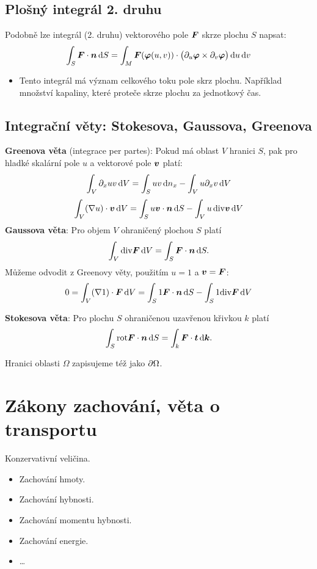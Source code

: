\subsection{Plošný integrál 2. druhu}
Podobně lze integrál (2. druhu) vektorového pole $\mathbf{\boldsymbol{F}}$ skrze plochu $S$ napsat:
\[
  \int_S \mathbf{\boldsymbol{F}}\cdot \mathbf{\boldsymbol{n}} \,{\rm d} S = \int_M \mathbf{\boldsymbol{F}}( \mathbf{\boldsymbol{\varphi}}(u,v) ) \cdot \big( \partial_u \mathbf{\boldsymbol{\varphi}} \times \partial_v \mathbf{\boldsymbol{\varphi}}\big) \,{\rm d} u\,{\rm d} v
\]
\begin{itemize}
 \item Tento integrál má význam celkového toku pole skrz plochu. Například množství kapaliny, které proteče skrze plochu za jednotkový čas.
\end{itemize}




\subsection{Integrační věty: Stokesova, Gaussova, Greenova}
{\bf Greenova věta} (integrace per partes):
Pokud má oblast $V$ hranici $S$, pak pro hladké skalární pole $u$ a vektorové pole $\mathbf{\boldsymbol{v}}$ platí:
\[
        \int_V  \partial_x u  v \,{\rm d} V = \int_S u v  \,{\rm d} n_x - \int_V u \partial_x v \,{\rm d} V
\]
\[
        \int_V (\nabla u) \cdot \mathbf{\boldsymbol{v}} \,{\rm d} V = \int_S u \mathbf{\boldsymbol{v}} \cdot \mathbf{\boldsymbol{n}} \,{\rm d} S - \int_V u\, {\rm div} \mathbf{\boldsymbol{v}} \,{\rm d} V
\]
{\bf Gaussova věta}: Pro objem $V$ ohraničený plochou $S$ platí
\[
        \int_V {\rm div} \mathbf{\boldsymbol{F}} \,{\rm d} V = \int_S \mathbf{\boldsymbol{F}}\cdot \mathbf{\boldsymbol{n}} \,{\rm d} S.
\]
Můžeme odvodit z Greenovy věty, použitím $u=1$ a $\mathbf{\boldsymbol{v}} = \mathbf{\boldsymbol{F}}$:
\[
    0=\int_V (\nabla 1) \cdot \mathbf{\boldsymbol{F}} \,{\rm d} V  = \int_S 1\mathbf{\boldsymbol{F}} \cdot \mathbf{\boldsymbol{n}} \,{\rm d} S - \int_S 1 {\rm div} \mathbf{\boldsymbol{F}}  \,{\rm d} V
\]


{\bf Stokesova věta}: Pro plochu $S$ ohraničenou uzavřenou křivkou $k$ platí
\[
        \int_S {\rm rot} \mathbf{\boldsymbol{F}} \cdot \mathbf{\boldsymbol{n}} \,{\rm d} S = \int_k \mathbf{\boldsymbol{F}}\cdot \mathbf{\boldsymbol{t}} \,{\rm d} \mathbf{\boldsymbol{k}}.
\]

Hranici oblasti $\Omega$ zapisujeme též jako $\partial \Omega$. 

\section{Zákony zachování, věta o transportu}
Konzervativní veličina.
\begin{itemize}
 \item Zachování hmoty.
 \item Zachování hybnosti.
 \item Zachování momentu hybnosti.
 \item Zachování energie.
 \item \dots
\end{itemize}


